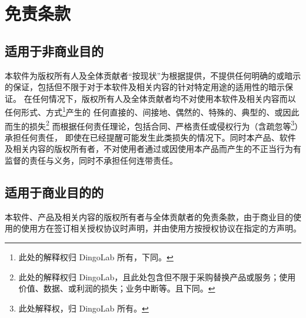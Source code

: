   \section{免责条款}
  \subsection{适用于非商业目的}
  本软件为版权所有人及全体贡献者“按现状”为根据提供，不提供任何明确的或暗示的保证，包括但不限于对于本软件及相关内容的针对特定用途的适用性的暗示保证。
  在任何情况下，版权所有人及全体贡献者均不对使用本软件及相关内容而以任何形式、方式\footnote{此处的解释权归 DingoLab 所有，下同。}产生的
  任何直接的、间接地、偶然的、特殊的、典型的、或因此而生的损失\footnote{此处的解释权归 DingoLab，且此处包含但不限于采购替换产品或服务；使用价值、数据、或利润的损失；业务中断等。且下同。}
  而根据任何责任理论，包括合同、严格责任或侵权行为（含疏忽等\footnote{此处解释权，归 DingoLab 所有。}）承担任何责任，
  即使在已经提醒可能发生此类损失的情况下。同时本产品、软件及相关内容的版权所有者，不对使用者通过或因使用本产品而产生的不正当行为有监督的责任与义务，同时不承担任何连带责任。
  \subsection{适用于商业目的的}
  本软件、产品及相关内容的版权所有者与全体贡献者的免责条款，由于商业目的使用的使用方在签订相关授权协议时声明，并由使用方按授权协议在指定的方声明。


